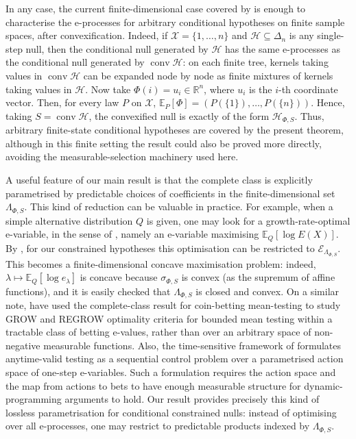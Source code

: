 \documentclass[10pt, a4paper]{article}
\newcommand{\E}{\mathbb E}
\newcommand{\e}{e}
\newcommand{\Ee}{\mathcal E}
\newcommand{\EeP}{\Ee_{\LP}}
\newcommand{\Hh}{\mathcal H}
\newcommand{\LP}{\Lambda_{\Phi,S}}
\newcommand{\R}{\mathbb R}
\newcommand{\sP}{\sigma_{\Phi,S}}
\newcommand{\X}{\mathcal X}
\DeclareMathOperator{\conv}{conv}
\begin{document}
In any case, the current finite-dimensional case covered by  is  enough to characterise the e-processes for arbitrary conditional hypotheses on finite sample spaces, after convexification. Indeed, if $\X=\{1,\dots,n\}$ and $\mathcal H\subseteq\Delta_n$ is any single-step null, then the conditional null generated by $\mathcal H$ has the same e-processes as the conditional null generated by $\conv\mathcal H$: on each finite tree, kernels taking values in $\conv\mathcal H$ can be expanded node by node as finite mixtures of kernels taking values in $\mathcal H$. Now take $\Phi(i)=u_i\in\R^n$, where $u_i$ is the $i$-th coordinate vector. Then, for every law $P$ on $\X$, $\E_P[\Phi]=(P(\{1\}),\dots,P(\{n\}))$. Hence, taking $S=\conv\mathcal H$, the convexified null is exactly of the form $\Hh_{\Phi,S}$. Thus, arbitrary finite-state conditional hypotheses are covered by the present theorem, although in this finite setting the result could also be proved more directly, avoiding the measurable-selection machinery used here.

A useful feature of our main result is that the complete class is explicitly parametrised by predictable choices of coefficients in the finite-dimensional set $\LP$. This kind of reduction can be valuable in practice. For example, when a simple alternative distribution $Q$ is given, one may look for a growth-rate-optimal e-variable, in the sense of \citet{grunwald2024safe}, namely an e-variable maximising $\E_Q[\log E(X)]$. By , for our constrained hypotheses this optimisation can be restricted to $\EeP$. This becomes a finite-dimensional concave maximisation problem: indeed, $\lambda\mapsto \E_Q[\log\e_\lambda]$ is concave because $\sP$ is convex (as the supremum of affine functions), and it is easily checked that $\LP$ is closed and convex. On a similar note, \citet{arnold2026optimal} have used the complete-class result for coin-betting mean-testing to study GROW and REGROW optimality criteria for bounded mean testing within a tractable class of betting e-values, rather than over an arbitrary space of non-negative measurable functions. Also, the time-sensitive framework of \citet{clerico2026timesensitive} formulates anytime-valid testing as a sequential control problem over a parametrised action space of one-step e-variables. Such a formulation requires the action space and the map from actions to bets to have enough measurable structure for  dynamic-programming arguments to hold. Our result provides precisely this kind of lossless parametrisation for conditional constrained nulls: instead of optimising over all e-processes, one may restrict  to predictable  products indexed by $\LP$.
\end{document}
